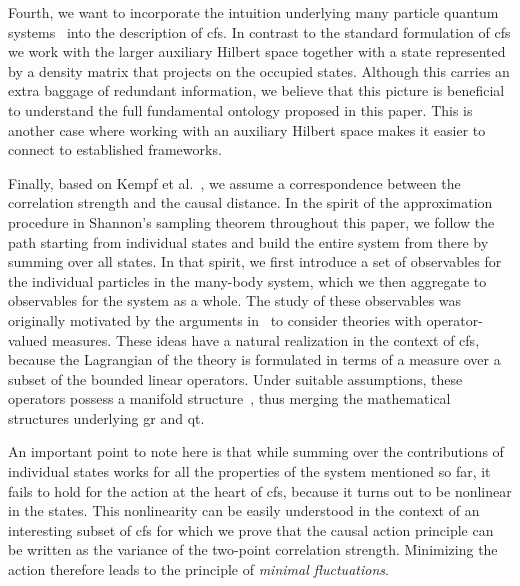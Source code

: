 \documentclass[reqno,11pt]{amsart}
\numberwithin{equation}{section}
\begin{document}
Fourth, we want to incorporate the intuition underlying many particle quantum systems~\cite{fetter2012quantum,zagoskin2016quantum,wen2004quantum} into the description of \ac{cfs}.
In contrast to the standard formulation of \ac{cfs} we work with the larger auxiliary Hilbert space together with a state
represented by a density matrix that projects on the occupied states.
Although this carries an extra baggage of redundant information, we believe that this picture is beneficial to understand the full fundamental ontology proposed in this paper.
This is another case where working with an auxiliary Hilbert space makes it easier to connect to established frameworks.

Finally, based on Kempf et al.~\cite{kempf2021correlational,goeller2022frames}, we assume a correspondence between the correlation strength and the causal distance.
In the spirit of the approximation procedure in Shannon's sampling theorem throughout this paper, we follow the path starting from
individual states and build the entire system from there by summing over all states.
In that spirit, we first introduce a set of observables for the individual particles in the many-body system,
which we then aggregate to observables for the system as a whole.
The study of these observables was originally motivated by the arguments in~\cite{dzhunushaliev2023quantum,dzhunushaliev2023quantization}
to consider theories with operator-valued measures.
These ideas have a natural realization in the context of \ac{cfs}, because the Lagrangian of the theory is formulated in
terms of a measure over a subset of the bounded linear operators.
Under suitable assumptions, these operators possess a manifold structure~\cite{Finster2021}, thus merging the mathematical structures
underlying \ac{gr} and \ac{qt}.

An important point to note here is that while summing over the contributions of individual states works for all the properties
of the system mentioned so far, it fails to hold for the action at the heart of \ac{cfs}, because it turns out to be nonlinear
in the states.
This nonlinearity can be easily understood in the context of an interesting subset of \ac{cfs} for which we prove that
the causal action principle can be written as the variance of the two-point correlation strength.
Minimizing the action therefore leads to the principle of \textit{minimal fluctuations}.
\end{document}
